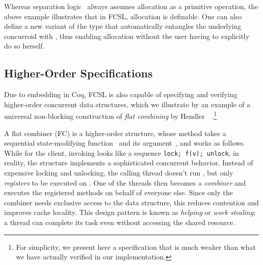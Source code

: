 Whereas separation logic~\cite{Reynolds:LICS02} always assumes
allocation as a primitive operation, the above example illustrates
that in FCSL, allocation is definable. One can also define a new
variant of the  type that automatically entangles the
underlying concurroid with , thus enabling allocation
without the user having to explicitly do so herself.

\subsection{Higher-Order Specifications}
\label{sec:high-order-spec}

Due to embedding in Coq, FCSL is also capable of specifying and
verifying higher-order concurrent data structures, which we illustrate
by an example of a universal non-blocking construction of \emph{flat
  combining} by Hendler~\etal~\cite{Hendler-al:SPAA10}.\footnote{For
  simplicity, we present here a specification that is much weaker than
  what we have actually verified in our implementation.}

A flat combiner (FC) is a higher-order structure, whose method
 takes a sequential state-modifying
function~ and its argument~, and works as
follows. While for the client, invoking  looks
like a sequence \texttt{\small{lock; f(v); unlock}}, in reality, the
structure implements a sophisticated concurrent
behavior. Instead of expensive locking and unlocking, the calling
thread doesn't run , but only \emph{registers}  to be
executed on . One of the threads then becomes a
\emph{combiner} and executes the registered methods on behalf of
everyone else. Since only the combiner needs exclusive access to the
data structure, this reduces contention and improves cache
locality. This design pattern is known as \emph{helping} or
\emph{work stealing}: a thread can complete its task even without accessing
the shared resource.


